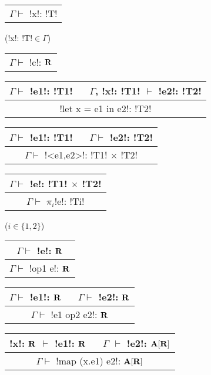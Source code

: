 \begin{figure*}[tb]
    \centering
    \begin{tabular}{c} 
    \\\hline
    $\Gamma \vdash$ !x!: !T!
    \end{tabular}(!x!: !T!$\in\Gamma$)
    \hspace{0.5cm}
    \begin{tabular}{c} 
        \\\hline
        $\Gamma \vdash$ !c!: $\mathbf{R}$
    \end{tabular}
    \hspace{0.5cm}
    \begin{tabular}{c}
    $\Gamma \vdash$ !e1!: !T1! $\quad$ $\Gamma$, !x!: !T1! $\vdash$ !e2!: !T2! \\\hline
    !let x = e1 in e2!: !T2!
    \end{tabular}

    \begin{tabular}{c}
    $\Gamma \vdash$ !e1!: !T1! $\quad$ $\Gamma \vdash$ !e2!: !T2! \\\hline  
    $\Gamma \vdash$ !<e1,e2>!: !T1! $\times$ !T2!
    \end{tabular}
    \hspace{0.5cm}
    \begin{tabular}{c}
        $\Gamma \vdash$ !e!: !T1! $\times$ !T2! \\\hline  
        $\Gamma \vdash$ $\pi_i$!e!: !Ti!
    \end{tabular}($i\in\{1,2\}$)

    \begin{tabular}{c}
        $\Gamma \vdash$ !e!: $\mathbf{R}$ \\\hline  
        $\Gamma \vdash$ !op1 e!: $\mathbf{R}$
    \end{tabular}
    \hspace{0.5cm}
    \begin{tabular}{c}
        $\Gamma \vdash$ !e1!: $\mathbf{R}$ $\quad$ $\Gamma \vdash$ !e2!: $\mathbf{R}$ \\\hline  
        $\Gamma \vdash$ !e1 op2 e2!: $\mathbf{R}$
        \end{tabular}
 
    \begin{tabular}{c}
        !x!: $\mathbf{R}$ $\vdash$ !e1!: $\mathbf{R}$ $\quad$ $\Gamma$ $\vdash$ !e2!: $\mathbf{A}[\mathbf{R}]$
        \\\hline  
        $\Gamma \vdash$ !map (x.e1) e2!: $\mathbf{A}[\mathbf{R}]$
    \end{tabular}


\end{figure*}
